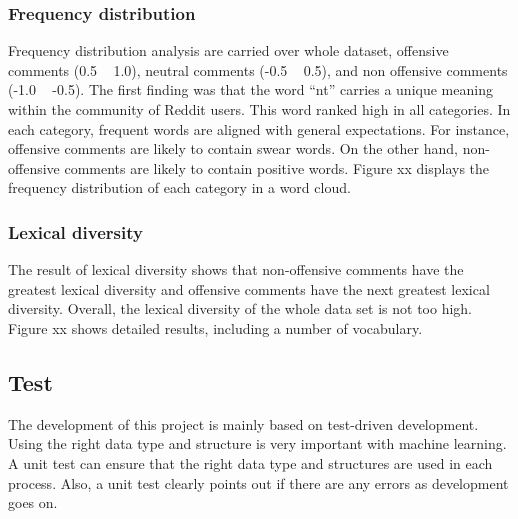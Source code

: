 \documentclass[11pt, natbib=false]{article}
\begin{document}
\begin{multicols}{2}
\subsubsection{Frequency distribution}
Frequency distribution analysis are carried over whole dataset, offensive comments (0.5 ~ 1.0), neutral comments (-0.5 ~ 0.5), and non offensive comments (-1.0 ~ -0.5).
The first finding was that the word “nt” carries a unique meaning within the community of Reddit users.
This word ranked high in all categories.
In each category, frequent words are aligned with general expectations.
For instance, offensive comments are likely to contain swear words.
On the other hand, non-offensive comments are likely to contain positive words.
Figure xx displays the frequency distribution of each category in a word cloud.

\subsubsection{Lexical diversity}
The result of lexical diversity shows that non-offensive comments have the greatest lexical diversity and offensive comments have the next greatest lexical diversity.
Overall, the lexical diversity of the whole data set is not too high.
Figure xx shows detailed results, including a number of vocabulary.

\subsection{Test}
The development of this project is mainly based on test-driven development.
Using the right data type and structure is very important with machine learning.
A unit test can ensure that the right data type and structures are used in each process.
Also, a unit test clearly points out if there are any errors as development goes on.


\end{multicols}
\end{document}
